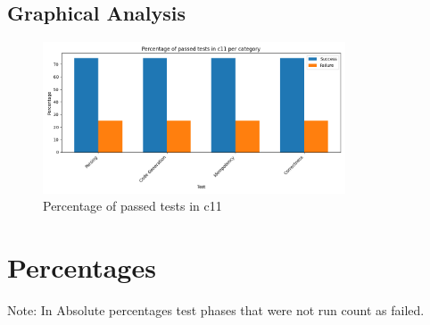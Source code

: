 \documentclass{article}
\begin{document}
\subsection{Graphical Analysis}
\begin{figure}[h!]
\centering
\includegraphics[width=0.8\textwidth]{../reports/clava/images/c11_percentage.png}
\caption{Percentage of passed tests in c11}
\label{fig:c11_percentage}
\end{figure}
\newpage
\section{Percentages}Note: In Absolute percentages test phases that were not run count as failed.
\end{document}
